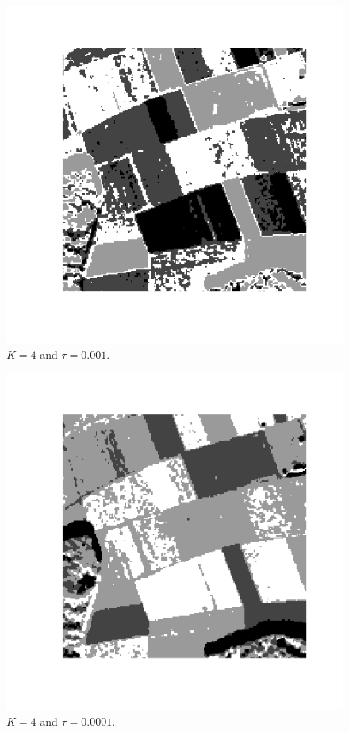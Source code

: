 \documentclass[twoside]{Homework}
\begin{document}
\begin{figure}[!ht]
  \centering
    \includegraphics[scale=0.6]{4-0001.png}
  \caption{$K=4$ and $\tau=0.001$.}
\end{figure}
\begin{figure}[!ht]
  \centering
    \includegraphics[scale=0.6]{4-00001.png}
  \caption{$K=4$ and $\tau=0.0001$.}
\end{figure}
\end{document}
